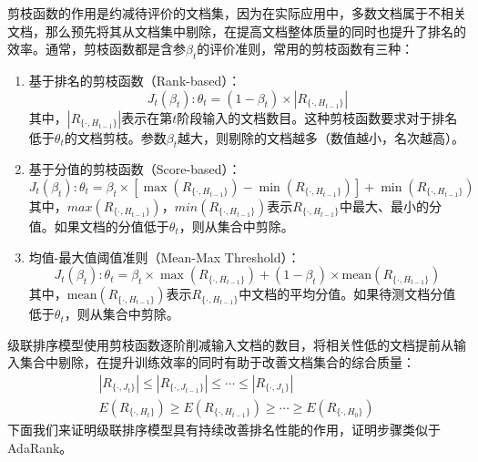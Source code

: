 剪枝函数的作用是约减待评价的文档集，因为在实际应用中，多数文档属于不相关文档，那么预先将其从文档集中剔除，在提高文档整体质量的同时也提升了排名的效率。通常，剪枝函数都是含参$\beta_t$的评价准则，常用的剪枝函数有三种：
\begin{enumerate}
  \item 基于排名的剪枝函数（Rank-based）：
  \[
    J_t(\beta_t) : \theta_t = (1-\beta_t) \times |R_{\{\cdot,H_{t-1}\}}|
  \]
  其中，$|R_{\{\cdot,H_{t-1}\}}|$表示在第$t$阶段输入的文档数目。这种剪枝函数要求对于排名低于$\theta_t$的文档剪枝。参数$\beta_t$越大，则剔除的文档越多（数值越小，名次越高）。
  \item 基于分值的剪枝函数（Score-based）：
  \[
    J_t(\beta_t) : \theta_t = \beta_t \times [\max(R_{\{\cdot,H_{t-1}\}}) - \min(R_{\{\cdot,H_{t-1}\}})] + \min(R_{\{\cdot,H_{t-1}\}})
  \]
  其中，$max(R_{\{\cdot,H_{t-1}\}})$，$min(R_{\{\cdot,H_{t-1}\}})$表示$R_{\{\cdot,H_{t-1}\}}$中最大、最小的分值。如果文档的分值低于$\theta_t$，则从集合中剪除。
  \item 均值-最大值阈值准则（Mean-Max Threshold）：
  \[
    J_t(\beta_t) : \theta_t = \beta_t \times \max(R_{\{\cdot,H_{t-1}\}}) + (1-\beta_t) \times \mathrm{mean}(R_{\{\cdot,H_{t-1}\}})
  \]
  其中，$\mathrm{mean}(R_{\{\cdot,H_{t-1}\}})$表示$R_{\{\cdot,H_{t-1}\}}$中文档的平均分值。如果待测文档分值低于$\theta_t$，则从集合中剪除。
\end{enumerate}

级联排序模型使用剪枝函数逐阶削减输入文档的数目，将相关性低的文档提前从输入集合中剔除，在提升训练效率的同时有助于改善文档集合的综合质量：
\begin{equation}
    \begin{array}{l}
      |R_{\{\cdot,J_t\}}| \le |R_{\{\cdot,J_{t-1}\}}| \le \cdots \le |R_{\{\cdot,J_1\}}|\\
      E(R_{\{\cdot,H_t\}}) \ge E(R_{\{\cdot,H_{t-1}\}}) \ge \cdots \ge E(R_{\{\cdot,H_0\}})
    \end{array}
\end{equation}
下面我们来证明级联排序模型具有持续改善排名性能的作用，证明步骤类似于AdaRank。

